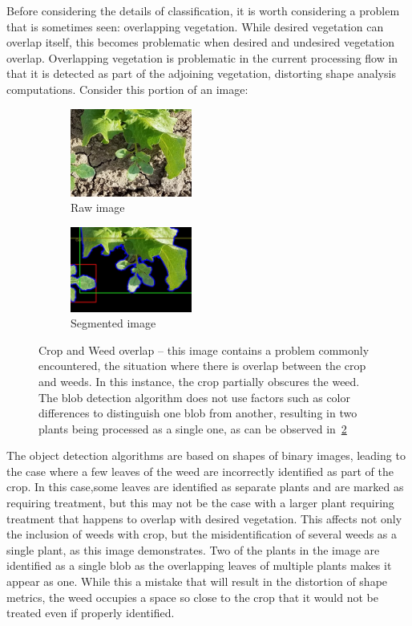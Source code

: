 \documentclass[letterpaper]{article}
\begin{document}
{Before considering the details of classification, it is worth considering a problem that is sometimes seen: overlapping vegetation. While desired vegetation can overlap itself, this becomes problematic when desired and undesired vegetation overlap. Overlapping vegetation is problematic in the current processing flow in that it is detected as part of the adjoining vegetation, distorting shape analysis computations.  Consider this portion of an image:
\begin{figure}[H]
	\centering
	\begin{subfigure}[h]{.40\textwidth}
		\centering
		\includegraphics[width=4cm]{./figures/overlapping-weed.jpg}
		\caption{Raw image}
		\label{fig:overlap-raw}
	\end{subfigure}
	\begin{subfigure}[h]{.40\textwidth}
		\centering
		\includegraphics[width=4cm]{./figures/overlapping-weed-segmented.jpg}
		\caption{Segmented image}
		\label{fig:overlap-segmented}
	\end{subfigure}
	\caption[Crop and Weed overlap]{Crop and Weed overlap -- this image contains a problem commonly encountered, the situation where there is overlap between the crop and weeds. In this instance, the crop partially obscures the weed. The blob detection algorithm does not use factors such as color differences to distinguish one blob from another, resulting in two plants being processed as a single one, as can be observed in~\ref{fig:overlap-segmented}}
	\label{fig:overlap}
\end{figure}


The object detection algorithms are based on shapes of binary images, leading to the case where a few leaves of the weed are incorrectly identified as part of the crop. In this case,some leaves are identified as separate plants and are marked as requiring treatment, but this may not be the case with a larger plant requiring treatment that happens to overlap with desired vegetation. This affects not only the inclusion of weeds with crop, but the misidentification of several weeds as a single plant, as this image demonstrates.  Two of the plants in the image are identified as a single blob as the overlapping leaves of multiple plants makes it appear as one. While this a mistake that will result in the distortion of shape metrics, the weed occupies a space so close to the crop that it would not be treated even if properly identified.

}
\end{document}

